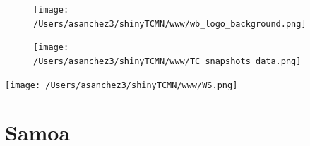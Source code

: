 \documentclass{article}\usepackage[]{graphicx}\usepackage[]{color}
\begin{document}
%

\begin{figure}
  \vspace{-3ex} %
  \hspace{-7ex} %
  \texttt{[image: /Users/asanchez3/shinyTCMN/www/wb\_logo\_background.png]}
\end{figure}
\begin{figure}
  \begin{minipage}[t]{0.99\textwidth} %
      \vspace{-30ex}
      \hspace{-2ex}
      \raggedright{\texttt{[image: /Users/asanchez3/shinyTCMN/www/TC\_snapshots\_data.png]}}
  \end{minipage}
\end{figure}
%
\begin{minipage}[t]{0.99\textwidth} %
  \vspace{-1.5cm}
  \begin{minipage}[c]{0.36\textwidth} 
    \begin{minipage}[c]{0.28\textwidth} %
      \texttt{[image: /Users/asanchez3/shinyTCMN/www/WS.png]}
    \end{minipage}
    \begin{minipage}[c]{0.70\textwidth} %
      \section*{\color{blue!40!black}Samoa}
    \end{minipage}
  \end{minipage}
  \begin{minipage}[c]{0.63\textwidth} %
    \centering
  \end{minipage}  
\end{minipage} %
\end{document}
